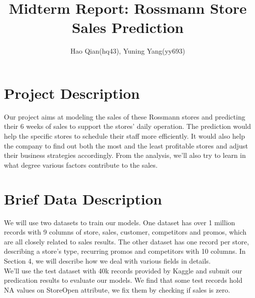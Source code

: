 \documentclass[11pt]{article}
\title{Midterm Report: Rossmann Store Sales Prediction}
\date{\vspace{-5ex}}
\author{Hao Qian(hq43), Yuning Yang(yy693)}
\begin{document}
\maketitle
\section{Project Description}
Our project aims at modeling the sales of these Rossmann stores and predicting their 6 weeks of sales to support the stores’ daily operation. The prediction would help the specific stores to schedule their staff more efficiently. It would also help the company to find out both the most and the least profitable stores and adjust their business strategies accordingly. From the analysis, we'll also try to learn in what degree various factors contribute to the sales. 

\section{Brief Data Description}
We will use two datasets to train our models. One dataset has over 1 million records with 9 columns of store, sales, customer, competitors and promos, which are all closely related to sales results. The other dataset has one record per store, describing a store's type, recurring promos and competitors with 10 columns. In Section 4, we will describe how we deal with various fields in details.\\
We'll use the test dataset with 40k records provided by Kaggle and submit our predication results to evaluate our models. We find that some test records hold NA values on StoreOpen attribute, we fix them by checking if sales is zero.
\end{document}
